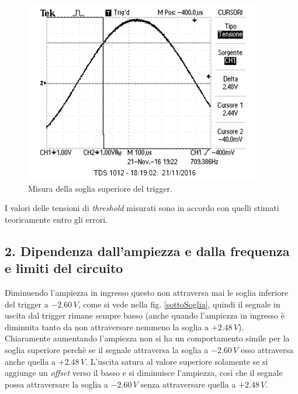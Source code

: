 \documentclass[10pt,a4paper]{article}
\begin{document}
\begin{figure}[htb!]
\centering
\includegraphics[scale=1.0]{immagini/FotoRicordoVth2.png}
\caption{Misura della soglia superiore del trigger.}
\label{sogliapiu}
\end{figure}

I valori delle tensioni di \emph{threshold} misurati sono in accordo con quelli stimati teoricamente entro gli errori.

\subsection*{2. Dipendenza dall'ampiezza e dalla frequenza e limiti del circuito}

Diminuendo l'ampiezza in ingresso questo non attraversa mai le soglia inferiore del trigger a $-2.60\,V$, come si vede nella fig. \ref{sottoSoglia}, quindi il segnale in uscita dal trigger rimane sempre basso (anche quando l'ampiezza in ingresso è diminuita tanto da non attraversare nemmeno la soglia a $+2.48\,V$).\\
Chiaramente aumentando l'ampiezza non si ha un comportamento simile per la soglia superiore perchè se il segnale attraversa la soglia a $-2.60\,V$ esso attraversa anche quella a $+2.48\,V$. L'uscita satura al valore superiore solamente se si aggiunge un \emph{offset} verso il basso e si diminuisce l'ampiezza, così che il segnale possa attraversare la soglia a $-2.60\,V$ senza attraversare quella a $+2.48\,V$.
\end{document}
